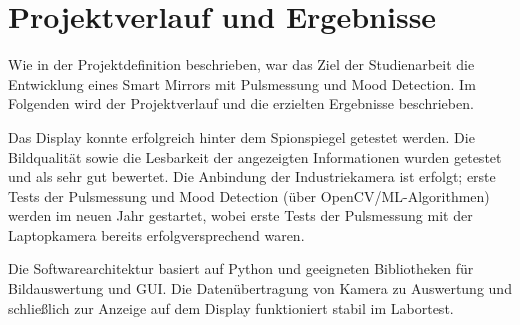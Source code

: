 
\chapter{Projektverlauf und Ergebnisse}

Wie in der Projektdefinition beschrieben, war das Ziel der Studienarbeit die Entwicklung eines Smart Mirrors mit Pulsmessung und Mood Detection. Im Folgenden wird der Projektverlauf und die erzielten Ergebnisse beschrieben.

Das Display konnte erfolgreich hinter dem Spionspiegel getestet werden. Die Bildqualität sowie die Lesbarkeit der angezeigten Informationen wurden getestet und als sehr gut bewertet. Die Anbindung der Industriekamera ist erfolgt; erste Tests der Pulsmessung und Mood Detection (über OpenCV/ML-Algorithmen) werden im neuen Jahr gestartet, wobei erste Tests der Pulsmessung mit der Laptopkamera bereits erfolgversprechend waren.

Die Softwarearchitektur basiert auf Python und geeigneten Bibliotheken für Bildauswertung und GUI. Die Datenübertragung von Kamera zu Auswertung und schließlich zur Anzeige auf dem Display funktioniert stabil im Labortest.
